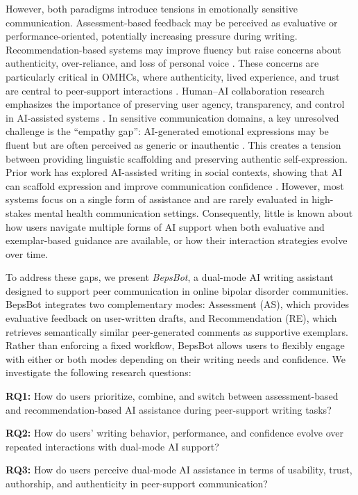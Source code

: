\documentclass[]{llncs}
\begin{document}
However, both paradigms introduce tensions in emotionally sensitive communication. Assessment-based feedback may be perceived as evaluative or performance-oriented, potentially increasing pressure during writing. Recommendation-based systems may improve fluency but raise concerns about authenticity, over-reliance, and loss of personal voice \cite{Shen2024,Jakesch2019}. These concerns are particularly critical in OMHCs, where authenticity, lived experience, and trust are central to peer-support interactions \cite{DeChoudhury2020}. Human--AI collaboration research emphasizes the importance of preserving user agency, transparency, and control in AI-assisted systems \cite{Amershi2019}. In sensitive communication domains, a key unresolved challenge is the ``empathy gap'': AI-generated emotional expressions may be fluent but are often perceived as generic or inauthentic \cite{Jakesch2019,Jakesch2023b}. This creates a tension between providing linguistic scaffolding and preserving authentic self-expression. Prior work has explored AI-assisted writing in social contexts, showing that AI can scaffold expression and improve communication confidence \cite{Wu2019,Kim2019}. However, most systems focus on a single form of assistance and are rarely evaluated in high-stakes mental health communication settings. Consequently, little is known about how users navigate multiple forms of AI support when both evaluative and exemplar-based guidance are available, or how their interaction strategies evolve over time.

To address these gaps, we present \textit{BepsBot}, a dual-mode AI writing assistant designed to support peer communication in online bipolar disorder communities. BepsBot integrates two complementary modes: Assessment (AS), which provides evaluative feedback on user-written drafts, and Recommendation (RE), which retrieves semantically similar peer-generated comments as supportive exemplars. Rather than enforcing a fixed workflow, BepsBot allows users to flexibly engage with either or both modes depending on their writing needs and confidence. We investigate the following research questions:

\textbf{RQ1:} How do users prioritize, combine, and switch between assessment-based and recommendation-based AI assistance during peer-support writing tasks?

\textbf{RQ2:} How do users’ writing behavior, performance, and confidence evolve over repeated interactions with dual-mode AI support?

\textbf{RQ3:} How do users perceive dual-mode AI assistance in terms of usability, trust, authorship, and authenticity in peer-support communication?
\end{document}
